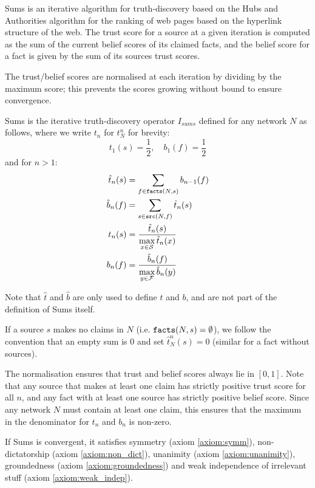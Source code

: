\documentclass[../main.tex]{subfiles}
\begin{document}
Sums\cite{pasternack} is an iterative algorithm for truth-discovery based on
the Hubs and Authorities \cite{kleinberg} algorithm for the ranking of web
pages based on the hyperlink structure of the web. The trust score for a source
at a given iteration is computed as the sum of the current belief scores of its
claimed facts, and the belief score for a fact is given by the sum of its
sources trust scores.

The trust/belief scores are normalised at each iteration by dividing by the
maximum score; this prevents the scores growing without bound to ensure
convergence.

\begin{definition}[Sums]
Sums is the iterative truth-discovery operator $I_{sums}$ defined for any
network $N$ as follows, where we write $t_n$ for $t_N^n$ for brevity:
\[
    t_1(s) = \frac{1}{2}, \quad b_1(f) = \frac{1}{2}
\]
and for $n > 1$:
\begin{align*}
    \hat{t}_n(s) & = \sum_{f \in \texttt{facts}(N, s)}{b_{n - 1}(f)} \\
    \hat{b}_n(f) & = \sum_{s \in \texttt{src}(N, f)}{\hat{t}_n(s)} \\
    t_n(s) & = \frac{\hat{t}_n(s)}{\max\limits_{x \in \mathcal{S}}{\hat{t}_n(x)}} \\
    b_n(f) & = \frac{\hat{b}_n(f)}{\max\limits_{y \in \mathcal{F}}{\hat{b}_n(y)}}
\end{align*}

Note that $\hat{t}$ and $\hat{b}$ are only used to define $t$ and $b$, and are
not part of the definition of Sums itself.

If a source $s$ makes no claims in $N$ (i.e. $\texttt{facts}(N, s) = \emptyset$), we
follow the convention that an empty sum is 0 and set $\hat{t}_N^n(s)=0$
(similar for a fact without sources).
\end{definition}

\begin{remark}
The normalisation ensures that trust and belief scores always lie in $[0, 1]$.
Note that any source that makes at least one claim has strictly positive trust
score for all $n$, and any fact with at least one source has strictly positive
belief score. Since any network $N$ must contain at least one claim, this
ensures that the maximum in the denominator for $t_n$ and $b_n$ is non-zero.
\end{remark}

\begin{theorem}
\label{theorem:sums_axioms}
If Sums is convergent, it satisfies symmetry (axiom \ref{axiom:symm}),
non-dictatorship (axiom \ref{axiom:non_dict}), unanimity (axiom
\ref{axiom:unanimity}), groundedness (axiom \ref{axiom:groundedness}) and
weak independence of irrelevant stuff (axiom \ref{axiom:weak_indep}).
\end{theorem}
\end{document}
